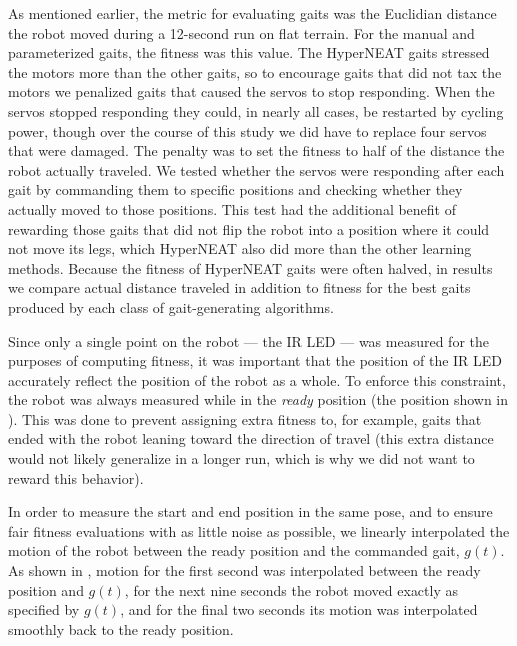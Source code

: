 As mentioned earlier, the metric for evaluating gaits was the Euclidian distance the robot
moved during a 12-second run on flat terrain. For the manual and parameterized gaits,
the fitness was this value. The HyperNEAT gaits stressed the motors
more than the other gaits, so to encourage gaits that did not tax the
motors we penalized gaits that caused the servos to stop
responding. When the servos stopped responding they could, in nearly
all cases, be restarted by cycling power, though over the course of
this study we did have to replace four servos that were damaged.
The penalty was to set the fitness to half of the distance
the robot actually traveled. We tested whether the servos were
responding after each gait by commanding them to specific positions
and checking whether they actually moved to those positions. This test
had the additional benefit of rewarding those gaits that did not flip
the robot into a position where it could not move its legs, which
HyperNEAT also did more than the other learning methods. Because the
fitness of HyperNEAT gaits were often halved, in results we compare
actual distance traveled in addition to fitness for the best gaits
produced by each class of gait-generating algorithms.

Since only a single point on the robot --- the IR LED --- was measured
for the purposes of computing fitness, it was important that the
position of the IR LED accurately reflect the position of the robot as
a whole.  To enforce this constraint, the robot was always measured
while in the \emph{ready} position (the position shown in
).  This was done to prevent assigning extra
fitness to, for example, gaits that ended with the robot leaning toward
the direction of travel (this extra distance would not likely generalize
in a longer run, which is why we did not want to reward this behavior).

In order to measure the start and end position in the same pose, and to ensure fair fitness evaluations with as little noise as possible, we
linearly interpolated the motion of the robot between the ready
position and the commanded gait, $g(t)$.  As shown in
, motion for the first second was interpolated
between the ready position and $g(t)$, for the next nine seconds the
robot moved exactly as specified by $g(t)$, and for the final two
seconds its motion was interpolated smoothly back to the ready
position.



